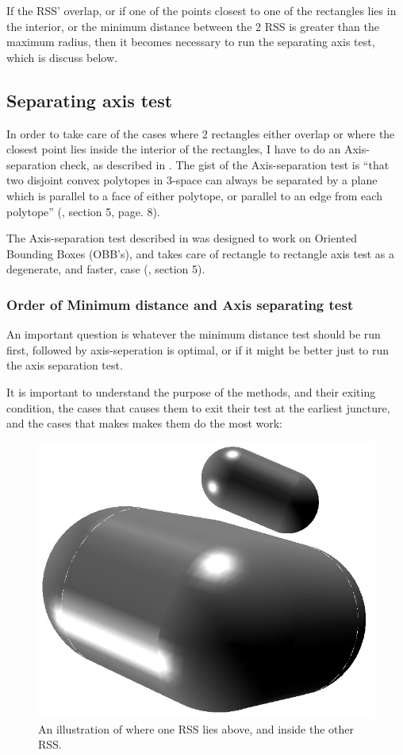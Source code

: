If the RSS' overlap, or if one of the points closest to one of the rectangles lies in the interior, or the minimum distance between the 2 RSS is greater than the maximum radius, then it becomes necessary to run the separating axis test, which is discuss below.

\subsection{Separating axis test}
\label{sepAxis}

In order to take care of the cases where 2 rectangles either overlap or where the closest point lies inside the interior of the rectangles, I have to do an Axis-separation check, as described in \cite{237244}. The gist of the Axis-separation test is ``that two disjoint convex polytopes in 3-space can always be separated by a plane which is parallel to a face of either polytope, or parallel to an edge from each polytope'' (\cite{237244}, section 5, page. 8).

The Axis-separation test described in \cite{237244} was designed to work on Oriented Bounding Boxes (OBB's), and takes care of rectangle to rectangle axis test as a degenerate, and faster, case (\cite{237244}, section 5).

\subsubsection{Order of Minimum distance and Axis separating test}
\label{minAxisOrder}
An important question is whatever the minimum distance test should be run first, followed by axis-seperation is optimal, or if it might be better just to run the axis separation test.

It is important to understand the purpose of the methods, and their exiting condition, the cases that causes them to exit their test at the earliest juncture, and the cases that makes makes them do the most work:

\begin{figure}
\centering
\includegraphics[width=\textwidth]{figures/sepAxis}
\caption{\label{parallel} An illustration of where one RSS lies above, and inside the other RSS.}
\end{figure}

